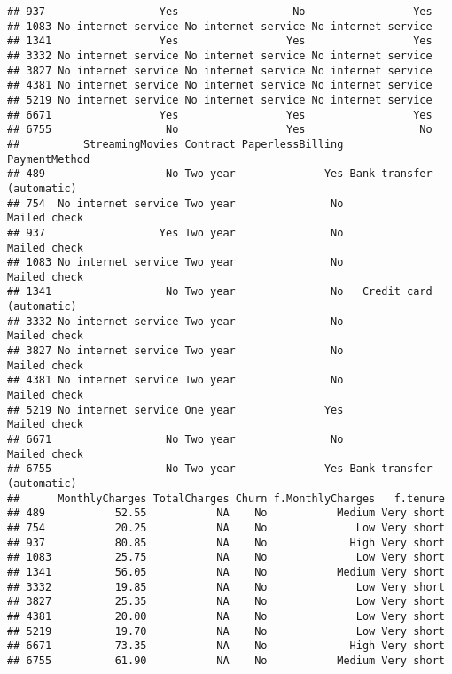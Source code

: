 \documentclass[
  a4paper]{article}
\newenvironment{Shaded}{\begin{snugshade}}{\end{snugshade}}
\newcommand{\AttributeTok}[1]{\textcolor[rgb]{0.13,0.29,0.53}{#1}}
\newcommand{\CommentTok}[1]{\textcolor[rgb]{0.56,0.35,0.01}{\textit{#1}}}
\newcommand{\ConstantTok}[1]{\textcolor[rgb]{0.56,0.35,0.01}{#1}}
\newcommand{\DecValTok}[1]{\textcolor[rgb]{0.00,0.00,0.81}{#1}}
\newcommand{\FunctionTok}[1]{\textcolor[rgb]{0.13,0.29,0.53}{\textbf{#1}}}
\newcommand{\NormalTok}[1]{#1}
\newcommand{\OtherTok}[1]{\textcolor[rgb]{0.56,0.35,0.01}{#1}}
\newcommand{\SpecialCharTok}[1]{\textcolor[rgb]{0.81,0.36,0.00}{\textbf{#1}}}
\begin{document}
\begin{verbatim}
## 937                  Yes                  No                 Yes
## 1083 No internet service No internet service No internet service
## 1341                 Yes                 Yes                 Yes
## 3332 No internet service No internet service No internet service
## 3827 No internet service No internet service No internet service
## 4381 No internet service No internet service No internet service
## 5219 No internet service No internet service No internet service
## 6671                 Yes                 Yes                 Yes
## 6755                  No                 Yes                  No
##          StreamingMovies Contract PaperlessBilling             PaymentMethod
## 489                   No Two year              Yes Bank transfer (automatic)
## 754  No internet service Two year               No              Mailed check
## 937                  Yes Two year               No              Mailed check
## 1083 No internet service Two year               No              Mailed check
## 1341                  No Two year               No   Credit card (automatic)
## 3332 No internet service Two year               No              Mailed check
## 3827 No internet service Two year               No              Mailed check
## 4381 No internet service Two year               No              Mailed check
## 5219 No internet service One year              Yes              Mailed check
## 6671                  No Two year               No              Mailed check
## 6755                  No Two year              Yes Bank transfer (automatic)
##      MonthlyCharges TotalCharges Churn f.MonthlyCharges   f.tenure
## 489           52.55           NA    No           Medium Very short
## 754           20.25           NA    No              Low Very short
## 937           80.85           NA    No             High Very short
## 1083          25.75           NA    No              Low Very short
## 1341          56.05           NA    No           Medium Very short
## 3332          19.85           NA    No              Low Very short
## 3827          25.35           NA    No              Low Very short
## 4381          20.00           NA    No              Low Very short
## 5219          19.70           NA    No              Low Very short
## 6671          73.35           NA    No             High Very short
## 6755          61.90           NA    No           Medium Very short
\end{verbatim}

\begin{Shaded}
\end{Shaded}
\end{document}

